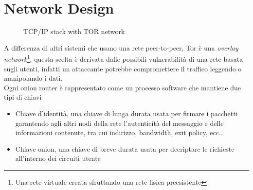 \section{Network Design}
\begin{wrapfigure}{1}{0.5\textwidth}
    \centering
    
    \caption{TCP/IP stack with TOR network}
    \label{fig:overlayNetwork}
\end{wrapfigure}

A differenza di altri sistemi che usano una rete peer-to-peer, Tor è una \emph{overlay network}\footnote{Una rete virtuale creata sfruttando una rete fisica preesistente}, questa scelta è derivata dalle possibili vulnerabilità di una rete basata sugli utenti, infatti un attaccante potrebbe compromettere il traffico leggendo o manipolando i dati. \\
Ogni onion router è rappresentato come un processo software che mantiene due tipi di chiavi
\begin{itemize}
    \item Chiave d'identità, una chiave di lunga durata usata per firmare i pacchetti garantendo agli altri nodi della rete l'autenticità del messaggio e delle informazioni contenute, tra cui indirizzo, bandwidth, exit policy, ecc..
    \item Chiave onion, una chiave di breve durata usata per decriptare le richieste all'interno dei circuiti utente
\end{itemize}

